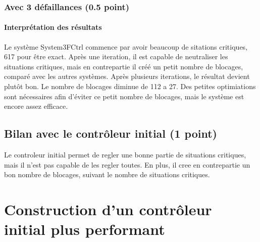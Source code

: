 \documentclass[a4paper]{book}
\begin{document}
\subsubsection{Avec 3 défaillances (0.5 point)}

\paragraph{Interprétation des résultats}
Le système System3FCtrl commence par avoir beaucoup de sitations critiques, 617 pour être
exact. Après une iteration, il est capable de neutraliser les situations critiques, mais en
contrepartie il créé un petit nombre de blocages, comparé avec les autres systèmes. Après
plusieurs iterations, le résultat devient plutôt bon. Le nombre de blocages diminue
de 112 a 27. Des petites optimiations sont nécessaires afin d'éviter ce petit nombre
de blocages, mais le système est encore assez efficace.

\subsection{Bilan avec le contrôleur initial (1 point)}
Le controleur initial permet de regler une bonne partie de situations critiques, mais il
n'est pas capable de les regler toutes. En plus, il cree en contrepartie un bon nombre
de blocages, suivant le nombre de situations critiques.

\section{Construction d'un contrôleur initial plus performant}
\end{document}
